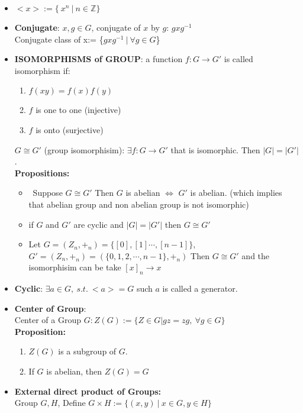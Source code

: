 \documentclass[12pt]{article}
\begin{document}
\begin{itemize}
        \item $<x> := \{\ x^n \ | \ n \in \mathbb{Z}\}$
        \item \textbf{Conjugate}: $x,g\in G$, conjugate of $x$ by $g$: $gxg^{-1}$\\
        Conjugate class of x:= \{$gxg^{-1} \ | \ \forall g \in G$\}
        \item \textbf{ISOMORPHISMS of GROUP}: a function $f : G \rightarrow G'$ is called isomorphism if:
        \begin{enumerate}
            \item $f(xy) = f(x)f(y)$
            \item $f$ is one to one (injective)
            \item $f$ is onto (surjective)
        \end{enumerate}
        $G \cong G'$ (group isomorphisim): $\exists f:G \rightarrow G'$ that is isomorphic. Then $|G| = |G'|$.\\
        \textbf{Propositions:}
        \begin{itemize}
            \item \ Suppose $G\cong  G'$ Then $G$ is abelian $\Leftrightarrow$ $G'$ is abelian. (which implies that abelian group and non abelian group is not isomorphic)
            \item if $G$ and $G'$ are cyclic and $|G| = |G'|$ then $G\cong G'$ 
            \item Let $G = (Z_n, +_n) = \{[0], [1] \cdots, [n-1]\}$, $G' = (Z_n, +_n) = (\{0,1,2,\cdots, n-1\}, +_n)$
            Then $G\cong G'$ and the isomorphisim can be take $[x]_n \rightarrow x$
        \end{itemize}
        \item \textbf{Cyclic}: $\exists a \in G, \ s.t. \ <a> = G$ such $a$ is called a generator.
        \item \textbf{Center of Group}:\\
        Center of a Group $G: Z(G):= \{Z\in G | gz = zg, \ \forall g \in G\}$\\
        \textbf{Proposition:}
        \begin{enumerate}
            \item $Z(G)$ is a subgroup of $G$.
            \item If $G$ is abelian, then $Z(G) = G$
        \end{enumerate}
        \item \textbf{External direct product of Groups:}\\
        Group $G, H$, Define $G \times H :=\{(x,y) \ | \ x\in G, y \in H\}$\\

\end{itemize}
\end{document}
